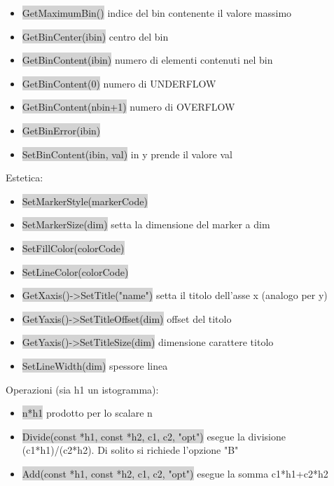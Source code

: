 \documentclass[a4paper]{article}
\begin{document}
    \begin{itemize}
        \item \colorbox{LightGray}{GetMaximumBin()} indice del bin contenente il valore massimo
        \item \colorbox{LightGray}{GetBinCenter(ibin)} centro del bin
        \item \colorbox{LightGray}{GetBinContent(ibin)} numero di elementi contenuti nel bin
        \item \colorbox{LightGray}{GetBinContent(0)} numero di UNDERFLOW
        \item \colorbox{LightGray}{GetBinContent(nbin+1)} numero di OVERFLOW
        \item \colorbox{LightGray}{GetBinError(ibin)}
        \item \colorbox{LightGray}{SetBinContent(ibin, val)} in y prende il valore val
    \end{itemize}
    Estetica:
    \begin{itemize}
        \item \colorbox{LightGray}{SetMarkerStyle(markerCode)}
        \item \colorbox{LightGray}{SetMarkerSize(dim)} setta la dimensione del marker a dim
        \item \colorbox{LightGray}{SetFillColor(colorCode)}
        \item \colorbox{LightGray}{SetLineColor(colorCode)}
        \item \colorbox{LightGray}{GetXaxis()->SetTitle("name")} setta il titolo dell'asse x (analogo per y)
        \item \colorbox{LightGray}{GetYaxis()->SetTitleOffset(dim)} offset del titolo
        \item \colorbox{LightGray}{GetYaxis()->SetTitleSize(dim)} dimensione carattere titolo
        \item \colorbox{LightGray}{SetLineWidth(dim)} spessore linea
    \end{itemize}
    Operazioni (sia h1 un istogramma):
    \begin{itemize}
        \item \colorbox{LightGray}{n*h1} prodotto per lo scalare n
        \item \colorbox{LightGray}{Divide(const *h1, const *h2, c1, c2, "opt")} esegue la divisione (c1*h1)/(c2*h2). Di solito si richiede l'opzione "B"
        \item \colorbox{LightGray}{Add(const *h1, const *h2, c1, c2, "opt")} esegue la somma c1*h1+c2*h2
    \end{itemize}
\end{document}
